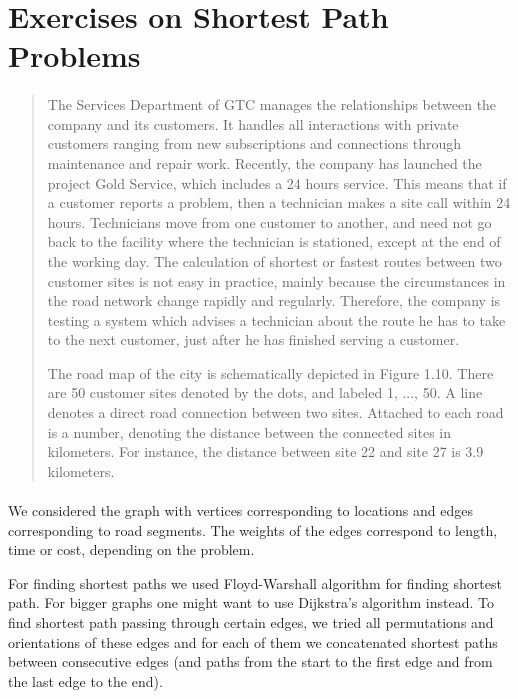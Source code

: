\section{Exercises on Shortest Path Problems}

\paragraph{}
\begin{quote}
The Services Department of GTC manages the relationships between the company and its customers. It handles all interactions with private customers ranging from new subscriptions and connections through maintenance and repair work. Recently, the company has launched the project Gold Service, which includes a 24 hours service. This means that if a customer reports a problem, then a technician makes a site call within 24 hours. Technicians move from one customer to another, and need not go back to the facility where the technician is stationed, except at the end of the working day. The calculation of shortest or fastest routes between two customer sites is not easy in practice, mainly because the circumstances in the road network change rapidly and regularly. Therefore, the company is testing a system which advises a technician about the route he has to take to the next customer, just after he has finished serving a customer.

The road map of the city is schematically depicted in Figure 1.10. There are 50 customer sites denoted by the dots, and labeled 1, ..., 50. A line denotes a direct road connection between two sites. Attached to each road is a number, denoting the distance between the connected sites in kilometers. For instance, the distance between site 22 and site 27 is 3.9 kilometers.
\end{quote}

\paragraph{}
We considered the graph with vertices corresponding to locations and edges corresponding to road segments. The weights of the edges correspond to length, time or cost, depending on the problem.

For finding shortest paths we used Floyd-Warshall algorithm for finding shortest path. For bigger graphs one might want to use Dijkstra’s algorithm instead. To find shortest path passing through certain edges, we tried all permutations and orientations of these edges and for each of them we concatenated shortest paths between consecutive edges (and paths from the start to the first edge and from the last edge to the end).

